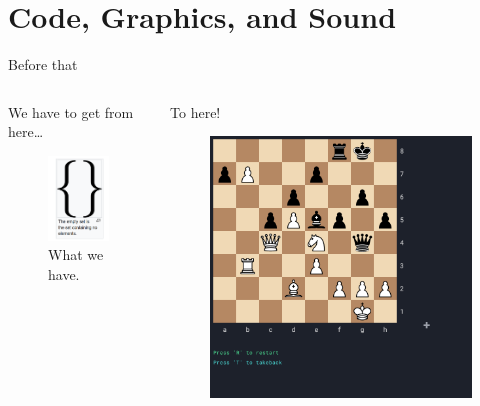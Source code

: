 \documentclass[english]{beamer}
\begin{document}
\section{Code, Graphics, and Sound}
\begin{frame}{Before that}
    \begin{columns}[T]
        \begin{column}{.5\textwidth}
            We have to get from here\dots
            \begin{figure}
                \centering
                \includegraphics[width=.65\textwidth]{images/empty_set.png}
                \caption{What we have.}
            \end{figure}
        \end{column}
        \begin{column}{.5\textwidth}
            To here!
            \begin{figure}
                \centering
                \includegraphics[width=.9\textwidth]{images/gui_example.png}

\end{figure}
\end{column}
\end{columns}
\end{frame}
\end{document}
